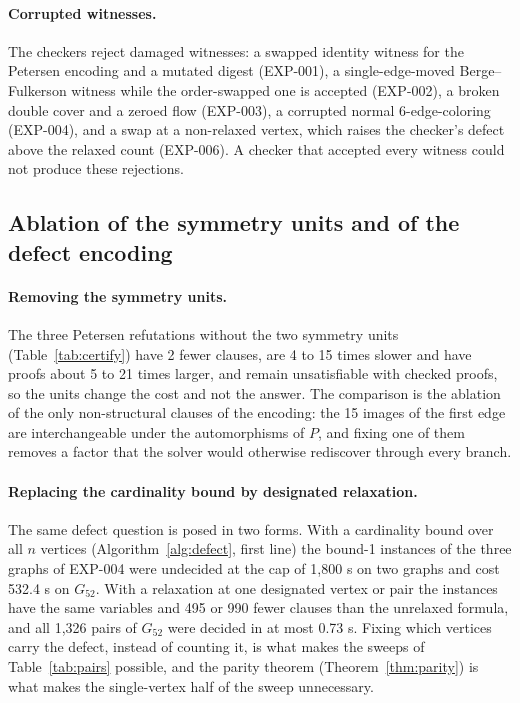 \documentclass[11pt]{article}
\theoremstyle{definition}
\theoremstyle{remark}
\newcommand{\PG}{P}
\newcommand{\Gfty}{G_{52}}
\begin{document}
\begin{table}[htbp]\centering\footnotesize\setlength{\tabcolsep}{4pt}

\caption{Known-value controls of the cover, oddness, resistance and flow encodings on the Petersen
graph, $J_5$, $K_4$ and the prism, each recovered by the encoders (computations EXP-002 and EXP-003).}\label{tab:controlvalues}
\end{table}

\paragraph{Corrupted witnesses.} The checkers reject damaged witnesses: a swapped identity witness
for the Petersen encoding and a mutated digest (EXP-001), a single-edge-moved Berge--Fulkerson witness
while the order-swapped one is accepted (EXP-002), a broken double cover and a zeroed flow
(EXP-003), a corrupted normal 6-edge-coloring (EXP-004), and a swap at a non-relaxed vertex, which
raises the checker's defect above the relaxed count (EXP-006). A checker that accepted every witness
could not produce these rejections.

\subsection{Ablation of the symmetry units and of the defect encoding}

\paragraph{Removing the symmetry units.} The three Petersen refutations without the two symmetry
units (Table~\ref{tab:certify}) have 2 fewer clauses, are 4 to 15 times slower and have proofs
about 5 to 21 times larger, and remain unsatisfiable with checked proofs, so the units change the cost
and not the answer. The comparison is the ablation of the only non-structural clauses of the encoding:
the 15 images of the first edge are interchangeable under the automorphisms of $\PG$, and fixing one of
them removes a factor that the solver would otherwise rediscover through every branch.

\paragraph{Replacing the cardinality bound by designated relaxation.} The same defect question is
posed in two forms. With a cardinality bound over all $n$ vertices (Algorithm~\ref{alg:defect}, first
line) the bound-1 instances of the three graphs of EXP-004 were undecided at the cap of 1{,}800 s on
two graphs and cost 532.4 s on $\Gfty$. With a relaxation at one designated vertex or pair the
instances have the same variables and 495 or 990 fewer clauses than the unrelaxed formula, and all
1{,}326 pairs of $\Gfty$ were decided in at most 0.73 s. Fixing which vertices carry the defect, instead of counting it, is what
makes the sweeps of Table~\ref{tab:pairs} possible, and the parity theorem
(Theorem~\ref{thm:parity}) is what makes the single-vertex half of the sweep unnecessary.
\end{document}

